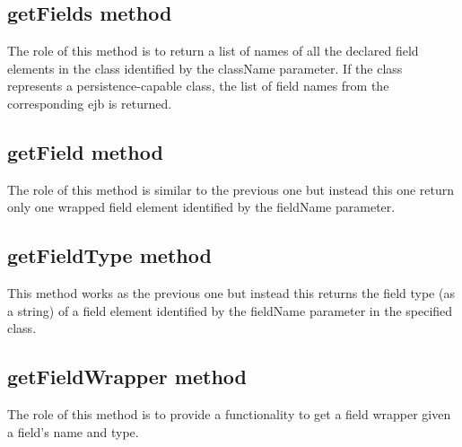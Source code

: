 \subsection{getFields method}
The role of this method is to return a list of names of all the declared field elements in the class identified by the className parameter. If the class represents a persistence-capable class, the list of field names from the corresponding ejb is returned.

\subsection{getField method}
The role of this method is similar to the previous one but instead this one return only one wrapped field element identified by the fieldName parameter.

\subsection{getFieldType method}
This method works as the previous one but instead this returns the field type (as a string) of a field element identified by the fieldName parameter in the specified class.

\subsection{getFieldWrapper method}
The role of this method is to provide a functionality to get a field wrapper given a field's name and type.